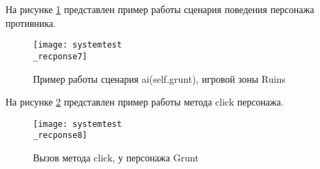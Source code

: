 На рисунке \ref{systemtest_recponse7:image} представлен пример работы сценария поведения персонажа противника.
\begin{figure}[H]
	\centering
	\texttt{[image: systemtest\\\_recponse7]}
	\caption{Пример работы сценария ai(self.grunt), игровой зоны Ruins}
	\label{systemtest_recponse7:image}
\end{figure}

На рисунке \ref{systemtest_recponse8:image} представлен пример работы метода click персонажа.
\begin{figure}[H]
	\centering
	\texttt{[image: systemtest\\\_recponse8]}
	\caption{Вызов метода click, у персонажа Grunt}
	\label{systemtest_recponse8:image}
\end{figure}